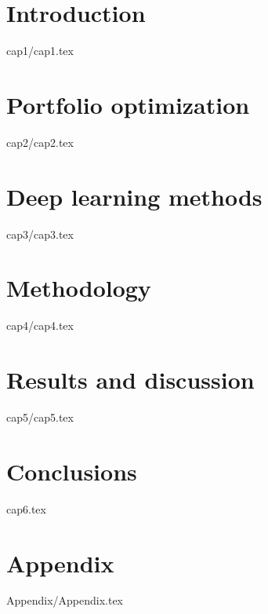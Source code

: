 \documentclass[12pt,a4paper]{book}
\begin{document}
    
    \newpage
    \tableofcontents
    
    \newpage
    \listoffigures
    
    \newpage
    \listoftables
    
    \chapter{Introduction} 
    \label{CH:Intro}
    {cap1/cap1.tex}
    
    \chapter{Portfolio optimization}
    \label{CH:theoryFI}
    {cap2/cap2.tex}

    \chapter{Deep learning methods}
    \label{CH:theoryML}
    {cap3/cap3.tex}
    
    \chapter{Methodology}
    \label{CH:Model_research}
    {cap4/cap4.tex}


    \chapter{Results and discussion}
    \label{CH:Results}
    {cap5/cap5.tex}
    
    \chapter{Conclusions}
    \label{CH:Concl}
    {cap6.tex}
    
    
    

    
    \newpage
    \chapter*{Appendix}

    {Appendix/Appendix.tex}
    
    \newpage
\end{document}
